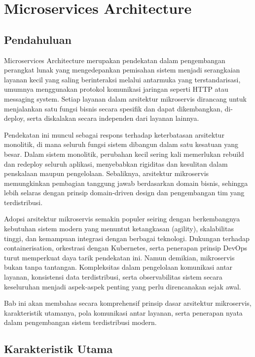 \chapter{Microservices Architecture}

\section{Pendahuluan}

Microservices Architecture merupakan pendekatan dalam pengembangan perangkat lunak yang mengedepankan pemisahan sistem menjadi serangkaian layanan kecil yang saling berinteraksi melalui antarmuka yang terstandarisasi, umumnya menggunakan protokol komunikasi jaringan seperti HTTP atau messaging system. Setiap layanan dalam arsitektur mikroservis dirancang untuk menjalankan satu fungsi bisnis secara spesifik dan dapat dikembangkan, di-deploy, serta diskalakan secara independen dari layanan lainnya.

Pendekatan ini muncul sebagai respons terhadap keterbatasan arsitektur monolitik, di mana seluruh fungsi sistem dibangun dalam satu kesatuan yang besar. Dalam sistem monolitik, perubahan kecil sering kali memerlukan rebuild dan redeploy seluruh aplikasi, menyebabkan rigiditas dan kesulitan dalam penskalaan maupun pengelolaan. Sebaliknya, arsitektur mikroservis memungkinkan pembagian tanggung jawab berdasarkan domain bisnis, sehingga lebih selaras dengan prinsip domain-driven design dan pengembangan tim yang terdistribusi.

Adopsi arsitektur mikroservis semakin populer seiring dengan berkembangnya kebutuhan sistem modern yang menuntut ketangkasan (agility), skalabilitas tinggi, dan kemampuan integrasi dengan berbagai teknologi. Dukungan terhadap containerisation, orkestrasi dengan Kubernetes, serta penerapan prinsip DevOps turut memperkuat daya tarik pendekatan ini. Namun demikian, mikroservis bukan tanpa tantangan. Kompleksitas dalam pengelolaan komunikasi antar layanan, konsistensi data terdistribusi, serta observabilitas sistem secara keseluruhan menjadi aspek-aspek penting yang perlu direncanakan sejak awal.

Bab ini akan membahas secara komprehensif prinsip dasar arsitektur mikroservis, karakteristik utamanya, pola komunikasi antar layanan, serta penerapan nyata dalam pengembangan sistem terdistribusi modern.

\section{Karakteristik Utama}

